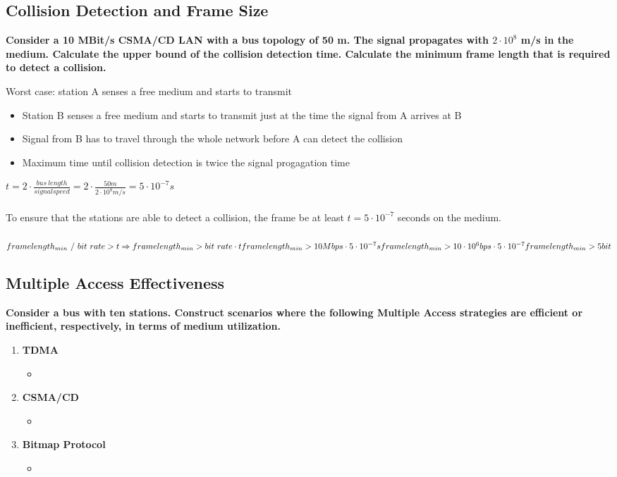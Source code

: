 \documentclass[a4paper,12pt]{article}
\begin{document}
	
	\subsection{Collision Detection and Frame Size}
	\textbf{Consider a 10 MBit/s CSMA/CD LAN with a bus topology of 50 m. The signal propagates with $2 \cdot 10^8$ m/s in the medium. Calculate the upper bound of the collision detection time. Calculate the minimum frame length that is required to detect a collision.\\}
	
	Worst case: station A senses a free medium and starts to transmit
	\begin{itemize}[itemsep=0pt]
		\item Station B senses a free medium and starts to transmit just at the time the signal from A arrives at B
		\item Signal from B has to travel through the whole network before A can detect the collision
		\item Maximum time until collision detection is twice the signal progagation time
	\end{itemize}

	$t = 2 \cdot \frac{bus~length}{signal speed} = 2 \cdot \frac{50 m}{2 \cdot 10^8 m/s} = 5 \cdot 10^{-7} s$ \\
	\\
	To ensure that the stations are able to detect a collision, the frame be at least $t = 5 \cdot 10^{-7}$ seconds on the medium.\\
	\\
	$frame length_{min} ~/~ bit~rate > t \Rightarrow frame length_{min} > bit~rate \cdot t\\
	frame length_{min} > 10Mbps \cdot 5 \cdot 10^{-7}s \\
	frame length_{min} > 10 \cdot 10^6 bps \cdot 5 \cdot 10^{-7} \\
	frame length_{min} > 5 bit $
	
	\subsection{Multiple Access Effectiveness}
	\textbf{Consider a bus with ten stations. Construct scenarios where the following Multiple Access strategies are efficient or inefficient, respectively, in terms of medium utilization.}
		\begin{enumerate}[label=(\roman*),itemsep=0pt]
		\item \textbf{TDMA}
		\begin{itemize}[itemsep=0pt]
			\item 
		\end{itemize}
		\item \textbf{CSMA/CD}
		\begin{itemize}[itemsep=0pt]
			\item 
		\end{itemize}
		\item \textbf{Bitmap Protocol}
		\begin{itemize}[itemsep=0pt]
			\item 
		\end{itemize}
	\end{enumerate}
	
\end{document}
